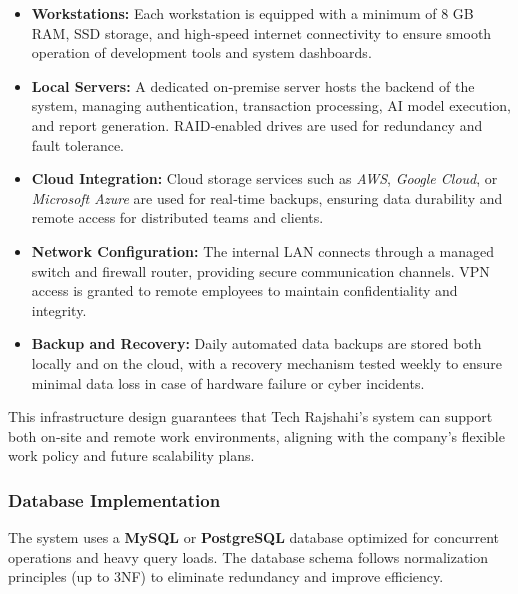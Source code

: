 \documentclass[12pt,a4paper]{article}
\begin{document}
\begin{itemize}
    \item \textbf{Workstations:} Each workstation is equipped with a minimum of 8 GB RAM, SSD storage, and high‑speed internet connectivity to ensure smooth operation of development tools and system dashboards.
    
    \item \textbf{Local Servers:} A dedicated on‑premise server hosts the backend of the system, managing authentication, transaction processing, AI model execution, and report generation.  RAID‑enabled drives are used for redundancy and fault tolerance.
    
    \item \textbf{Cloud Integration:} Cloud storage services such as \textit{AWS}, \textit{Google Cloud}, or \textit{Microsoft Azure} are used for real‑time backups, ensuring data durability and remote access for distributed teams and clients.
    
    \item \textbf{Network Configuration:} The internal LAN connects through a managed switch and firewall router, providing secure communication channels.  VPN access is granted to remote employees to maintain confidentiality and integrity.
    
    \item \textbf{Backup and Recovery:} Daily automated data backups are stored both locally and on the cloud, with a recovery mechanism tested weekly to ensure minimal data loss in case of hardware failure or cyber incidents.
\end{itemize}

This infrastructure design guarantees that Tech Rajshahi's system can support both on‑site and remote work environments, aligning with the company's flexible work policy and future scalability plans.

\subsubsection{Database Implementation}
The system uses a \textbf{MySQL} or \textbf{PostgreSQL} database optimized for concurrent operations and heavy query loads.  The database schema follows normalization principles (up to 3NF) to eliminate redundancy and improve efficiency.
\end{document}
